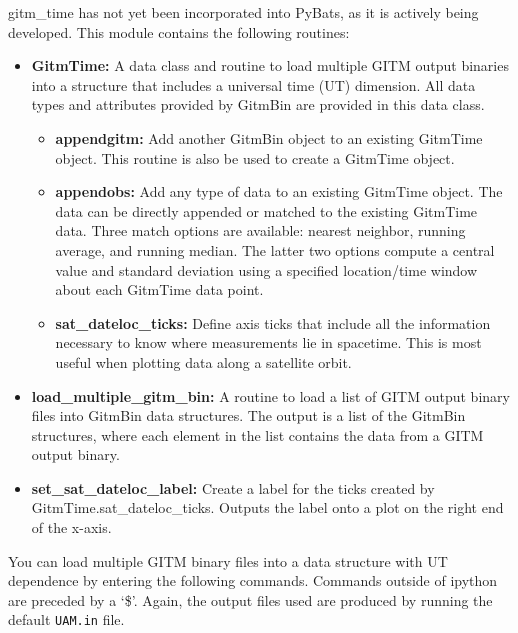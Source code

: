 gitm\_time has not yet been incorporated into PyBats, as it is actively being developed.   This module contains the following routines:

\begin{itemize}
\item[]{\bf GitmTime: } A data class and routine to load multiple GITM output binaries into a structure that includes a universal time (UT) dimension.  All data types and attributes provided by GitmBin are provided in this data class.
	\begin{itemize}
	\item[]{\bf appendgitm: } Add another GitmBin object to an existing GitmTime object.  This routine is also be used to create a GitmTime object.
	\item[]{\bf appendobs: } Add any type of data to an existing GitmTime object.  The data can be directly appended or matched to the existing GitmTime data.  Three match options are available: nearest neighbor, running average, and running median.  The latter two options compute a central value and standard deviation using a specified location/time window about each GitmTime data point.
	\item[]{\bf sat\_dateloc\_ticks: } Define axis ticks that include all the information necessary to know where measurements lie in spacetime.  This is most useful when plotting data along a satellite orbit.
	\end{itemize}
\item[]{\bf load\_multiple\_gitm\_bin: } A routine to load a list of GITM output binary files into GitmBin data structures.  The output is a list of the GitmBin structures, where each element in the list contains the data from a GITM output binary.
\item[]{\bf set\_sat\_dateloc\_label: } Create a label for the ticks created by GitmTime.sat\_dateloc\_ticks.  Outputs the label onto a plot on the right end of the x-axis.
\end{itemize}

You can load multiple GITM binary files into a data structure with UT dependence by entering the following commands.  Commands outside of ipython are preceded by a `\$'.  Again, the output files used are produced by running the default {\tt UAM.in} file.

